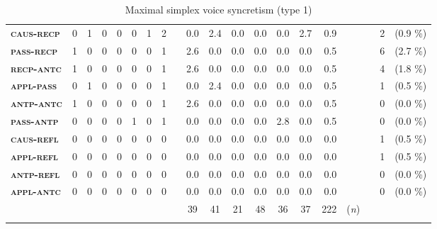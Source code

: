 \begin{sidewaystable}
\begin{tabularx}{\textwidth}{lrrrrrrrlrrrrrrrlrrr}
		\textbf{\textsc{caus-recp}} & 0 & 1 & 0 & 0 & 0 & 1 & 2 & & 0.0 & 2.4 & 0.0 & 0.0 & 0.0 & 2.7 & 0.9 & & & 2 & (0.9 \%) \\
		\textbf{\textsc{pass-recp}} & 1 & 0 & 0 & 0 & 0 & 0 & 1 & & 2.6 & 0.0 & 0.0 & 0.0 & 0.0 & 0.0 & 0.5 & & & 6 & (2.7 \%) \\
		\textbf{\textsc{recp-antc}} & 1 & 0 & 0 & 0 & 0 & 0 & 1 & & 2.6 & 0.0 & 0.0 & 0.0 & 0.0 & 0.0 & 0.5 & & & 4 & (1.8 \%) \\
		\textbf{\textsc{appl-pass}} & 0 & 1 & 0 & 0 & 0 & 0 & 1 & & 0.0 & 2.4 & 0.0 & 0.0 & 0.0 & 0.0 & 0.5 & & & 1 & (0.5 \%) \\
		\textbf{\textsc{antp-antc}} & 1 & 0 & 0 & 0 & 0 & 0 & 1 & & 2.6 & 0.0 & 0.0 & 0.0 & 0.0 & 0.0 & 0.5 & & & 0 & (0.0 \%) \\
		\textbf{\textsc{pass-antp}} & 0 & 0 & 0 & 0 & 1 & 0 & 1 & & 0.0 & 0.0 & 0.0 & 0.0 & 2.8 & 0.0 & 0.5 & & & 0 & (0.0 \%) \\
		\textbf{\textsc{caus-refl}} & 0 & 0 & 0 & 0 & 0 & 0 & 0 & & 0.0 & 0.0 & 0.0 & 0.0 & 0.0 & 0.0 & 0.0 & & & 1 & (0.5 \%) \\
		\textbf{\textsc{appl-refl}} & 0 & 0 & 0 & 0 & 0 & 0 & 0 & & 0.0 & 0.0 & 0.0 & 0.0 & 0.0 & 0.0 & 0.0 & & & 1 & (0.5 \%) \\
		\textbf{\textsc{antp-refl}} & 0 & 0 & 0 & 0 & 0 & 0 & 0 & & 0.0 & 0.0 & 0.0 & 0.0 & 0.0 & 0.0 & 0.0 & & & 0 & (0.0 \%) \\
		\textbf{\textsc{appl-antc}} & 0 & 0 & 0 & 0 & 0 & 0 & 0 & & 0.0 & 0.0 & 0.0 & 0.0 & 0.0 & 0.0 & 0.0 & & & 0 & (0.0 \%) \\
		\midrule
		& & & & & & & & & \multicolumn{1}{c}{39} & \multicolumn{1}{c}{41} & \multicolumn{1}{c}{21} & \multicolumn{1}{c}{48} & \multicolumn{1}{c}{36} & \multicolumn{1}{c}{37} & \multicolumn{1}{c}{222} & (\textit{n}) & & & \\
		\lspbottomrule
	\end{tabularx}
	\caption{Maximal simplex voice syncretism (type 1)}
	\label{tab:ch6:voice-syncretism-maximal-simplex-macroarea}
\end{sidewaystable} 


